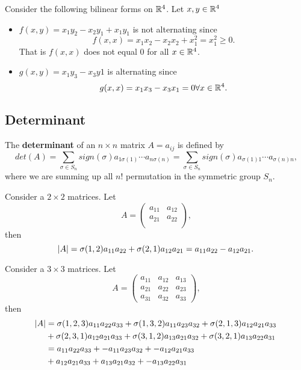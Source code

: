 \begin{refsection}
\begin{example}
Consider the following bilinear forms on $\mathbb{R}^4$. Let $x,y\in \mathbb{R}^4$ 
\begin{itemize}
	\item $f(x,y) = x_1y_2 - x_2y_1 + x_1y_1$ is not alternating since
	$$f(x,x) = x_1x_2 - x_2x_2 + x_1^2 = x_1^2 \geq 0.$$
That is $f(x,x)$ does not equal 0 for all $x\in \mathbb{R}^4$.
\item $g(x,y) = x_1y_3 - x_3y1$ is alternating since
$$g(x,x) = x_1x_3 - x_3x_1 = 0 \forall x\in \mathbb{R}^4.$$	
\end{itemize}	
\end{example}

\subsection{Determinant}


\begin{definition}[determinant]\cite[279]{banerjee2014linear}
	The \textbf{determinant} of an $n\times n$ matrix $A = a_{ij}$ is defined by
	$$det(A) = \sum_{\sigma \in S_n} sign(\sigma)a_{1\sigma(1)}\cdots a_{n\sigma(n)} = \sum_{\sigma \in S_n} sign(\sigma)a_{\sigma(1)1}\cdots a_{\sigma(n)n},$$
where we are summing up all $n!$ permutation in the symmetric group $S_n$.	
\end{definition}



\begin{example}
Consider a $2\times 2$ matrices. Let 
$$A = \begin{pmatrix}
a_{11} & a_{12} \\
a_{21} & a_{22} \\
\end{pmatrix},$$
then 
$$\abs{A} = \sigma(1,2)a_{11}a_{22} + \sigma(2,1)a_{12}a_{21} = a_{11}a_{22}-a_{12}a_{21}.$$	
\end{example}

\begin{example}
	Consider a $3\times 3$ matrices. Let 
	$$A = \begin{pmatrix}
	a_{11} & a_{12} & a_{13}\\
	a_{21} & a_{22} & a_{23}\\
	a_{31} & a_{32} & a_{33}
	\end{pmatrix},$$
	then 
	\begin{align*}
	\abs{A} &= \sigma(1,2,3)a_{11}a_{22}a_{33} + \sigma(1,3,2)a_{11}a_{23}a_{32}+\sigma(2,1,3)a_{12}a_{21}a_{33}\\
	&+ \sigma(2,3,1)a_{12}a_{21}a_{33}+\sigma(3,1,2)a_{13}a_{21}a_{32}+\sigma(3,2,1)a_{13}a_{22}a_{31}\\
	&=a_{11}a_{22}a_{33} + -a_{11}a_{23}a_{32}+-a_{12}a_{21}a_{33}\\
	&+ a_{12}a_{21}a_{33}+a_{13}a_{21}a_{32}+-a_{13}a_{22}a_{31}
	\end{align*}	
\end{example}


\end{refsection}
